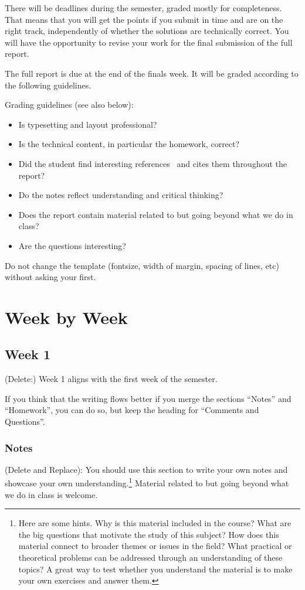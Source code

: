 \documentclass{article}
\theoremstyle{theorem}
\theoremstyle{definition}
\theoremstyle{remark}
\begin{document}
There will be deadlines during the semester, graded mostly for completeness. That means that you will get the points if you submit in time and are on the right track, independently of whether the solutions are technically correct. You will have the opportunity to revise your work for the final submission of the full report.

The full report is due at the end of the finals week. It will be graded according to the following guidelines.

Grading  guidelines (see also below):
\begin{itemize}
\item Is typesetting and layout professional? 
\item Is the technical content, in particular the homework, correct?
\item Did the student find interesting references~\cite{bla} and cites them throughout the report?
\item Do the notes reflect understanding and critical thinking?
\item Does the report contain material related to but going beyond what we do in class?
\item Are the questions interesting?
\end{itemize}

Do not change the template (fontsize, width of margin, spacing of lines, etc) without asking your first.

\section{Week by Week}\label{homework}

\subsection{Week 1}

(Delete:) Week 1 aligns with the first week of the semester. 

If you think that the writing flows better if you merge the sections ``Notes'' and ``Homework'', you can do so, but keep the heading for ``Comments and Questions''.

\subsubsection*{Notes}

(Delete and Replace): You should use this section to write your own notes and showcase your own understanding.\footnote{Here are some hints. Why is this material included in the course? What are the big questions that motivate the study of this subject? How does this material connect to broader themes or issues in the field? What practical or theoretical problems can be addressed through an understanding of these topics? A great way to test whether you understand the material is to make your own exercises and answer them.} Material related to but going beyond what we do in class is welcome.
\end{document}

